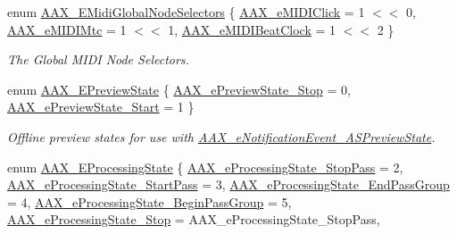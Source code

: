 \begin{DoxyCompactItemize}
enum \mbox{\hyperlink{a00491_a349dae6bc64bda67a5440cbc6637f92d}{A\+A\+X\+\_\+\+E\+Midi\+Global\+Node\+Selectors}} \{ \mbox{\hyperlink{a00491_a349dae6bc64bda67a5440cbc6637f92da07f7ef0ac806b94f96cc14e81678b84a}{A\+A\+X\+\_\+e\+M\+I\+D\+I\+Click}} = 1 $<$$<$ 0, 
\mbox{\hyperlink{a00491_a349dae6bc64bda67a5440cbc6637f92da29d1a888ea18fe3f32c7231ceb964e61}{A\+A\+X\+\_\+e\+M\+I\+D\+I\+Mtc}} = 1 $<$$<$ 1, 
\mbox{\hyperlink{a00491_a349dae6bc64bda67a5440cbc6637f92da7345d01457a861d2acb2e91d5669b803}{A\+A\+X\+\_\+e\+M\+I\+D\+I\+Beat\+Clock}} = 1 $<$$<$ 2
 \}
\begin{DoxyCompactList}\small\item\em The Global M\+I\+DI Node Selectors. \end{DoxyCompactList}\item 
enum \mbox{\hyperlink{a00491_a12b280d7ccf22568759f8deb1fe1d6a8}{A\+A\+X\+\_\+\+E\+Preview\+State}} \{ \mbox{\hyperlink{a00491_a12b280d7ccf22568759f8deb1fe1d6a8a70cc710d78a2ea494e2c251da8856c6e}{A\+A\+X\+\_\+e\+Preview\+State\+\_\+\+Stop}} = 0, 
\mbox{\hyperlink{a00491_a12b280d7ccf22568759f8deb1fe1d6a8a57da8c1b6b2ad294a707bb3ccf0fd68d}{A\+A\+X\+\_\+e\+Preview\+State\+\_\+\+Start}} = 1
 \}
\begin{DoxyCompactList}\small\item\em Offline preview states for use with \mbox{\hyperlink{a00491_afab5ea2cfd731fc8f163b6caa685406ea8ca3f7d5e93eecf945682f6fc55f5263}{A\+A\+X\+\_\+e\+Notification\+Event\+\_\+\+A\+S\+Preview\+State}}. \end{DoxyCompactList}\item 
enum \mbox{\hyperlink{a00491_a6ec854be40c8cf810dec97de3e56c0a7}{A\+A\+X\+\_\+\+E\+Processing\+State}} \{ \newline
\mbox{\hyperlink{a00491_a6ec854be40c8cf810dec97de3e56c0a7a07e96f54fb45a47b56e76091f0f44cbf}{A\+A\+X\+\_\+e\+Processing\+State\+\_\+\+Stop\+Pass}} = 2, 
\mbox{\hyperlink{a00491_a6ec854be40c8cf810dec97de3e56c0a7adf2cad11d0a42c0684bada7519202db2}{A\+A\+X\+\_\+e\+Processing\+State\+\_\+\+Start\+Pass}} = 3, 
\mbox{\hyperlink{a00491_a6ec854be40c8cf810dec97de3e56c0a7a6c7dcf22600f9fe8a6113dbd5ffd1605}{A\+A\+X\+\_\+e\+Processing\+State\+\_\+\+End\+Pass\+Group}} = 4, 
\mbox{\hyperlink{a00491_a6ec854be40c8cf810dec97de3e56c0a7a1fb443ff62601d3e5f5562a4af8edf41}{A\+A\+X\+\_\+e\+Processing\+State\+\_\+\+Begin\+Pass\+Group}} = 5, 
\newline
\mbox{\hyperlink{a00491_a6ec854be40c8cf810dec97de3e56c0a7afc388bf019f52b4d5bf6978b7ffec6d9}{A\+A\+X\+\_\+e\+Processing\+State\+\_\+\+Stop}} = A\+A\+X\+\_\+e\+Processing\+State\+\_\+\+Stop\+Pass, 
$$
\end{DoxyCompactItemize}
